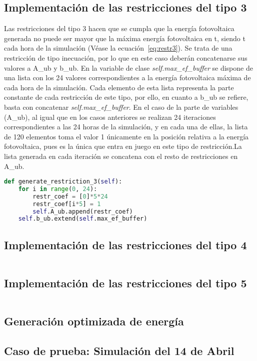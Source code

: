 \subsection{Implementación de las restricciones del tipo 3}
Las restricciones del tipo 3 hacen que se cumpla que la energía fotovoltaica generada no puede ser mayor que la máxima energía fotovoltaica en t, siendo t cada hora de la simulación (Véase la ecuación~\ref{eq:restr3}). Se trata de una restricción de tipo inecuación, por lo que en este caso deberán concatenarse sus valores a A\_ub y b\_ub. En la variable de clase \textit{self.max\_ef\_buffer} se dispone de una lista con los 24 valores correspondientes a la energía fotovoltaica máxima de cada hora de la simulación. Cada elemento de esta lista representa la parte constante de cada restricción de este tipo, por ello, en cuanto a b\_ub se refiere, basta con concatenar \textit{self.max\_ef\_buffer}. En el caso de la parte de variables (A\_ub), al igual que en los casos anteriores se realizan 24 iteraciones correspondientes a las 24 horas de la simulación, y en cada una de ellas, la lista de 120 elementos toma el valor 1 únicamente en la posición relativa a la energía fotovoltaica, pues es la única que entra en juego en este tipo de restricción.La lista generada en cada iteración se concatena con el resto de restricciones en A\_ub.
\begin{lstlisting}[language=Python,float=ht,caption={Restricciones del tipo 3},label={lst:restr3}]
def generate_restriction_3(self):
    for i in range(0, 24):
        restr_coef = [0]*5*24
        restr_coef[i*5] = 1
        self.A_ub.append(restr_coef)
    self.b_ub.extend(self.max_ef_buffer)
\end{lstlisting}
\subsection{Implementación de las restricciones del tipo 4}
\begin{lstlisting}[language=Python,float=ht,caption={Restricciones del tipo 4},label={lst:restr4}]

\end{lstlisting}
\subsection{Implementación de las restricciones del tipo 5}
\begin{lstlisting}[language=Python,float=ht,caption={Restricciones del tipo 5},label={lst:restr5}]

\end{lstlisting}
\subsection{Generación optimizada de energía}
\subsection{Caso de prueba: Simulación del 14 de Abril}
